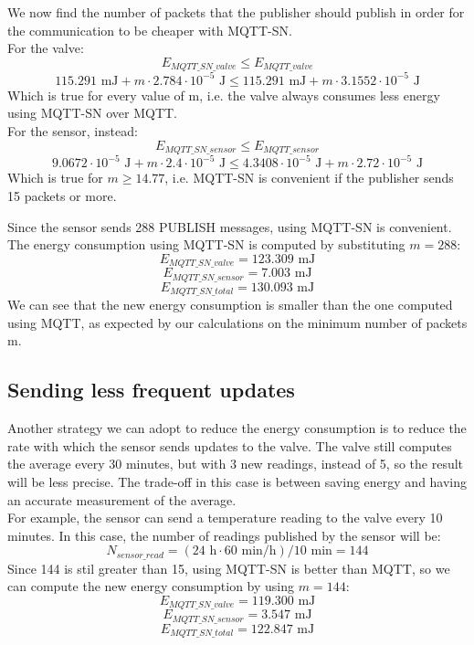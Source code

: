 We now find the number of packets that the publisher should publish in order for the communication to be cheaper with MQTT-SN.\\
For the valve:
\[E_{MQTT\_SN\_valve} \leq E_{MQTT\_valve} \]
\[115.291 \text{ mJ} + m \cdot 2.784 \cdot 10^{-5} \text{ J}  \leq 115.291 \text{ mJ} + m \cdot 3.1552 \cdot 10^{-5} \text{ J}\]
Which is true for every value of m, i.e. the valve always consumes less energy using MQTT-SN over MQTT.\\
For the sensor, instead:
\[E_{MQTT\_SN\_sensor} \leq E_{MQTT\_sensor}\]
\[9.0672 \cdot 10^{-5} \text{ J} + m \cdot 2.4 \cdot 10^{-5} \text{ J} \leq 4.3408 \cdot 10^{-5} \text{ J} + m \cdot 2.72 \cdot 10^{-5} \text{ J}\]
Which is true for $m \geq 14.77$, i.e. MQTT-SN is convenient if the publisher sends 15 packets or more.

Since the sensor sends 288 PUBLISH messages, using MQTT-SN is convenient. The energy consumption using MQTT-SN is computed by substituting $m = 288$:
\[E_{MQTT\_SN\_valve} = 123.309 \text{ mJ}\]
\[E_{MQTT\_SN\_sensor} = 7.003 \text{ mJ}\]
\[E_{MQTT\_SN\_total} = 130.093 \text{ mJ}\]
We can see that the new energy consumption is smaller than the one computed using MQTT, as expected by our calculations on the minimum number of packets m.

\subsection{Sending less frequent updates}
Another strategy we can adopt to reduce the energy consumption is to reduce the rate with which the sensor sends updates to the valve. The valve still computes the average every 30 minutes, but with 3 new readings, instead of 5, so the result will be less precise. The trade-off in this case is between saving energy and having an accurate measurement of the average.\\
For example, the sensor can send a temperature reading to the valve every 10 minutes. In this case, the number of readings published by the sensor will be:
\[N_{sensor\_read} = (24\text{ h}  \cdot 60 \text{ min/h}) / 10 \text{ min} = 144\]
Since 144 is stil greater than 15, using MQTT-SN is better than MQTT, so we can compute the new energy consumption by using $m = 144$:
\[E_{MQTT\_SN\_valve} = 119.300 \text{ mJ}\]
\[E_{MQTT\_SN\_sensor} = 3.547 \text{ mJ}\]
\[E_{MQTT\_SN\_total} = 122.847 \text{ mJ}\]


